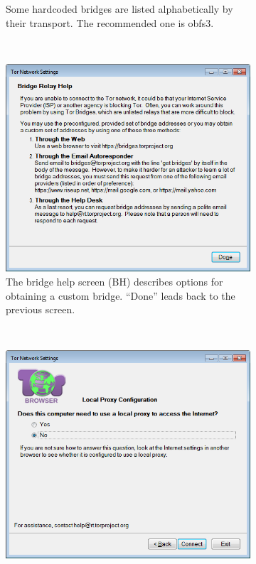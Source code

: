 \documentclass[USenglish,oneside,twocolumn]{article}
\begin{document}
\begin{figure}
\begin{subfigure}[b]{0.30\textwidth}
	\centering\captionsetup{width=1.5\linewidth}%
	\caption{Some hardcoded bridges are listed alphabetically by their transport. The recommended one is obfs3.}
	\label{fig:old-bridge-combobox}
\end{subfigure}
~~~~~~~~~~
\begin{subfigure}[b]{0.30\textwidth}
	\includegraphics[width=\textwidth]{screenshots/OLD-bridgeHelp.png}
	\centering\captionsetup{width=1.5\linewidth}%
	\caption{The bridge help screen (BH) describes options for obtaining a custom bridge. ``Done'' leads back to the previous screen.}
	\label{fig:old-bridge-help}
\end{subfigure}
~~~~~~~~~~~~~~~~~~~~~~~~~
\begin{subfigure}[b]{0.30\textwidth}
	\includegraphics[width=\textwidth]{screenshots/OLD-proxy.png}

\end{subfigure}
\end{figure}
\end{document}
